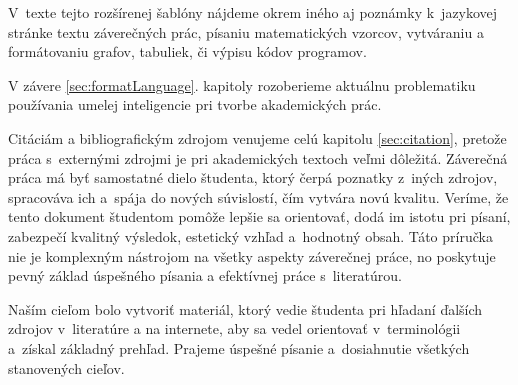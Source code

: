 V~texte tejto rozšírenej šablóny nájdeme okrem iného aj poznámky k~jazykovej stránke textu záverečných prác, písaniu matematických vzorcov, vytváraniu a formátovaniu grafov, tabuliek, či výpisu kódov programov.

V závere \ref{sec:formatLanguage}. kapitoly rozoberieme aktuálnu problematiku používania umelej inteligencie pri tvorbe akademických prác.

Citáciám a bibliografickým zdrojom venujeme celú kapitolu \ref{sec:citation},
pretože práca s~externými zdrojmi je pri akademických textoch veľmi dôležitá.
Záverečná práca má byť samostatné dielo študenta, 
ktorý čerpá poznatky z~iných zdrojov,
spracováva ich a~spája do nových súvislostí,
čím vytvára novú kvalitu.
Veríme, že tento dokument študentom pomôže lepšie sa orientovať,
dodá im istotu pri písaní,
zabezpečí kvalitný výsledok, estetický vzhľad
a~hodnotný obsah.
Táto príručka nie je komplexným nástrojom na všetky aspekty záverečnej práce,
no poskytuje pevný základ úspešného písania
a efektívnej práce s~literatúrou. 

Naším cieľom bolo vytvoriť materiál,
ktorý vedie študenta pri hľadaní ďalších zdrojov v~literatúre a na internete,
aby sa vedel orientovať v~terminológii a~získal základný prehľad.
Prajeme úspešné písanie a~dosiahnutie všetkých stanovených cieľov.

